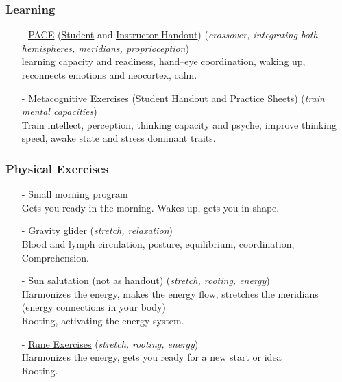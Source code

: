 \begin{frame}
\frametitle{Learning}
\begin{itemize}
\item[-] \href{run:./PACE_presentation.pdf}{\underline{PACE}}
(\href{run:./PACE_Handout_student.pdf}{\underline{Student}} and 
\href{run:./PACE_Handout_instructor.pdf}{\underline{Instructor Handout}})
 (\textit{crossover, integrating both hemispheres, meridians, proprioception})\\
 learning capacity and readiness, hand--eye coordination, waking up,  reconnects emotions and neocortex, calm.
 
\item[-] \href{run:./Metacognitive_Instructor.pdf}{\underline{Metacognitive Exercises}} 
(\href{run:./Metacognitive_Student.pdf}{\underline{Student Handout}} and
\href{run:./Metacognitive_Exercises.pdf}{\underline{Practice Sheets}})
 (\textit{train mental capacities})\\
Train intellect, perception, thinking capacity and psyche, improve thinking speed, awake state and stress dominant traits.
 \end{itemize}
\end{frame}
\begin{frame}
\frametitle{Physical Exercises}
\begin{itemize}
\item[-] \href{run:./Morning_Program.pdf}{\underline{Small morning program}} \\
Gets you ready in the morning. Wakes up, gets you in shape.
\item[-] \href{run:./Gravity_Glider.pdf}{\underline{Gravity glider}} 
 (\textit{stretch, relaxation})\\
Blood and lymph circulation, posture, equilibrium, coordination, \\
Comprehension.
\item[-] Sun salutation (not as handout)
 (\textit{stretch, rooting, energy})\\
Harmonizes the energy, makes the energy flow, stretches the meridians (energy connections in your body) \\
Rooting, activating the energy system.
\item[-] \href{run:./Rune_Exercises.pdf}{\underline{Rune Exercises}} 
 (\textit{stretch, rooting, energy})\\
Harmonizes the energy, gets you ready for a new start or idea \\
Rooting.
 \end{itemize}
\end{frame}
